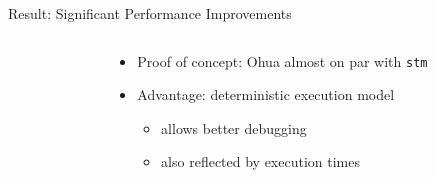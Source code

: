 \documentclass[aspectratio=169, usenames, dvipsnames]{beamer}
\begin{document}
\begin{frame}{Result: Significant Performance Improvements}
  \begin{columns}
    \begin{column}{0.55\textwidth}
      \centering
    \end{column}
    \begin{column}{0.45\textwidth}
      \begin{itemize}
        \item<2-> Proof of concept: Ohua almost on par with \alert{\texttt{stm}}
        \item<3-> Advantage: deterministic execution model
        \begin{itemize}
          \item<5-> allows better debugging
          \item<6-> also reflected by execution times
        \end{itemize}
      \end{itemize}
    \end{column}
  \end{columns}
\end{frame}
\end{document}

